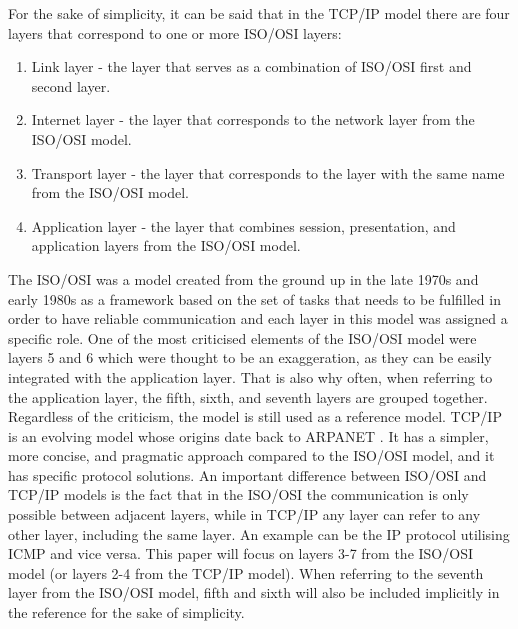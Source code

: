 For the sake of simplicity, it can be said that in the TCP/IP model there are four layers that correspond to one or more ISO/OSI layers:
\begin{enumerate}
    \item Link layer - the layer that serves as a combination of ISO/OSI first and second layer.
    \item Internet layer - the layer that corresponds to the network layer from the ISO/OSI model.
    \item Transport layer - the layer that corresponds to the layer with the same name from the ISO/OSI model.
    \item Application layer - the layer that combines session, presentation, and application layers from the ISO/OSI model.
\end{enumerate}
The ISO/OSI was a model created from the ground up in the late 1970s and early 1980s as a framework based on the set of tasks that needs to be fulfilled in order to have reliable communication and each layer in this model was assigned a specific role. One of the most criticised elements of the ISO/OSI model were layers 5 and 6 which were thought to be an exaggeration, as they can be easily integrated with the application layer. That is also why often, when referring to the application layer, the fifth, sixth, and seventh layers are grouped together. Regardless of the criticism, the model is still used as a reference model.
TCP/IP is an evolving model whose origins date back to ARPANET \cite{rfc1}. It has a simpler, more concise, and pragmatic approach compared to the ISO/OSI model, and it has specific protocol solutions. An important difference between ISO/OSI and TCP/IP models is the fact that in the ISO/OSI the communication is only possible between adjacent layers, while in TCP/IP any layer can refer to any other layer, including the same layer. An example can be the IP protocol utilising ICMP and vice versa.
This paper will focus on layers 3-7 from the ISO/OSI model (or layers 2-4 from the TCP/IP model). When referring to the seventh layer from the ISO/OSI model, fifth and sixth will also be included implicitly in the reference for the sake of simplicity.



